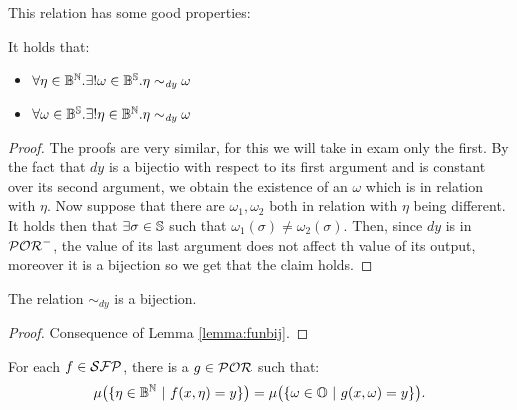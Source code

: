 This relation has some good properties:

\begin{lemma}
  \label{lemma:funbij}
  It holds that:
  \begin{itemize}
    \item $\forall \eta \in \mathbb{B}^{\mathbb{N}}. \exists ! \omega \in \mathbb{B}^{\mathbb{S}}. \eta \sim_{\mathit{dy}} \omega$
    \item $\forall \omega \in \mathbb{B}^{\mathbb{S}}. \exists ! \eta \in \mathbb{B}^{\mathbb{N}}. \eta \sim_{\mathit{dy}} \omega$
  \end{itemize}
\end{lemma}
\begin{proof}
  The proofs are very similar, for this we will take in exam only the first.
  By the fact that $\mathit{dy}$ is a bijectio  with respect to its
  first argument and is constant over its second argument,
  we obtain the existence of an $\omega$ which is in relation with $\eta$.
  Now suppose that there are $\omega_1, \omega_2$ both in relation with $\eta$
  being different. It holds then that $\exists \sigma \in\mathbb{S}$ such that
  $\omega_1(\sigma)\neq\omega_2(\sigma)$. Then, since $\mathit{dy}$ is in $\mathcal{POR}^-$,
  the value of its last argument does not affect th value of its output,
  moreover it is a bijection so we get that the claim holds.
\end{proof}
\begin{cor}
  The relation $\sim_{\mathit{dy}}$ is a bijection.
\end{cor}

\begin{proof}
  Consequence of Lemma \ref{lemma:funbij}.
\end{proof}











\begin{cor}
  For each $f \in \mathcal{SFP}$, there is a $g \in \mathcal{POR}$ such that:
  $$
  \mu\big(\{\eta \in \mathbb{B}^{\mathbb{N}} \ | \ f(x, \eta)=y \}\big)
  = \mu\big(\{\omega \in \mathbb{O} \ | \ g(x, \omega) =y\}\big).
  $$
\end{cor}

